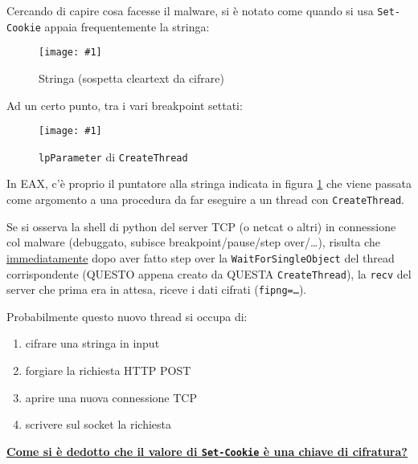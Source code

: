 \documentclass[
    a4paper, %
    11pt %
]{article}
\newcommand{\pic}[4]{\begin{figure}[H]
            \centering
            \texttt{[image: \#1]}
            \caption{#2}
            \label{fig:#1}
            \end{figure}}
\begin{document}
            Cercando di capire cosa facesse il malware, si è notato come quando si usa \texttt{Set-Cookie}
            appaia frequentemente la stringa:

            \pic{freqstr}{Stringa (sospetta cleartext da cifrare)}{14cm}{5cm}

            Ad un certo punto, tra i vari breakpoint settati:

            \pic{strarg}{\texttt{lpParameter} di \texttt{CreateThread}}{15cm}{3.5cm}

            In EAX, c'è proprio il puntatore alla stringa indicata in figura \ref{fig:freqstr} che viene passata come argomento
            a una procedura da far eseguire a un thread con \texttt{CreateThread}.

            Se si osserva la shell di python del server TCP (o netcat o altri) in connessione col malware (debuggato, subisce breakpoint/pause/step over/\dots), risulta che \underline{immediatamente}
            dopo aver fatto step over la \texttt{WaitForSingleObject} del thread corrispondente (QUESTO appena creato da QUESTA \texttt{CreateThread}), la \texttt{recv} del server che prima era in attesa, riceve i dati cifrati 
            (\texttt{fipng=\dots}).

            Probabilmente questo nuovo thread si occupa di:
            \begin{enumerate}
                \item cifrare una stringa in input
                \item forgiare la richiesta HTTP POST
                \item aprire una nuova connessione TCP
                \item scrivere sul socket la richiesta
            \end{enumerate}

            \underline{\textbf{Come si è dedotto che il valore di \texttt{Set-Cookie} è una chiave di cifratura?}}
\end{document}
